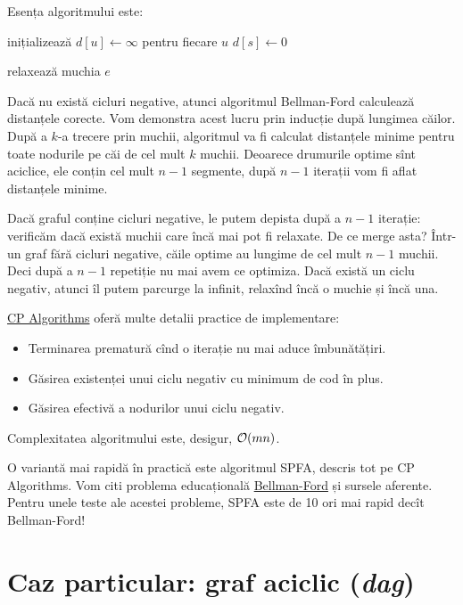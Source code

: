 \documentclass[../main.tex]{subfiles}
\begin{document}
Esența algoritmului este:

\begin{algorithm}[H]
  \caption{Algoritmul Bellman-Ford}
  \begin{algorithmic}[1]
    \State inițializează $d[u] \gets \infty$ pentru fiecare $u$
    \State $d[s] \gets 0$

        \State relaxează muchia $e$
      \EndFor
    \EndFor
  \end{algorithmic}
\end{algorithm}

Dacă nu există cicluri negative, atunci algoritmul Bellman-Ford calculează distanțele corecte. Vom demonstra acest lucru prin inducție după lungimea căilor. După a $k$-a trecere prin muchii, algoritmul va fi calculat distanțele minime pentru toate nodurile pe căi de cel mult $k$ muchii. Deoarece drumurile optime sînt aciclice, ele conțin cel mult $n-1$ segmente, după $n-1$ iterații vom fi aflat distanțele minime.

Dacă graful conține cicluri negative, le putem depista după a $n-1$ iterație: verificăm dacă există muchii care încă mai pot fi relaxate. De ce merge asta? Într-un graf fără cicluri negative, căile optime au lungime de cel mult $n-1$ muchii. Deci după a $n-1$ repetiție nu mai avem ce optimiza. Dacă există un ciclu negativ, atunci îl putem parcurge la infinit, relaxînd încă o muchie și încă una.

\href{https://cp-algorithms.com/graph/bellman_ford.html}{CP Algorithms} oferă multe detalii practice de implementare:

\begin{itemize}
  \item Terminarea prematură cînd o iterație nu mai aduce îmbunătățiri.
  \item Găsirea existenței unui ciclu negativ cu minimum de cod în plus.
  \item Găsirea efectivă a nodurilor unui ciclu negativ.
\end{itemize}

Complexitatea algoritmului este, desigur, $\mathcal{O}(mn)$.

O variantă mai rapidă în practică este algoritmul SPFA, descris tot pe CP Algorithms. Vom citi problema educațională \hyperref[problem:bellman-ford]{Bellman-Ford} și sursele aferente. Pentru unele teste ale acestei probleme, SPFA este de 10 ori mai rapid decît Bellman-Ford!

\section{Caz particular: graf aciclic (\textit{dag})}
\end{document}
